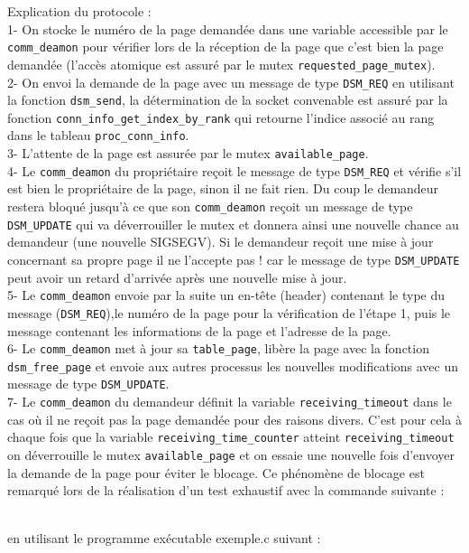 \noindent
Explication du protocole : \\
1- On stocke le numéro de la page demandée dans une variable accessible par le \texttt{comm\_deamon} pour vérifier lors de la réception de la page que c'est bien la page demandée (l'accès atomique est assuré par le mutex  \texttt{requested\_page\_mutex}).\\
2- On envoi la demande de la page avec un message de type \texttt{DSM\_REQ} en utilisant la fonction \texttt{dsm\_send}, la détermination de la socket convenable est assuré par la fonction \texttt{conn\_info\_get\_index\_by\_rank} qui retourne l'indice associé au rang dans le tableau \texttt{proc\_conn\_info}.\\
3- L'attente de la page est assurée par le mutex \texttt{available\_page}.\\
4- Le \texttt{comm\_deamon} du propriétaire reçoit le message de type \texttt{DSM\_REQ} et vérifie s'il est bien le propriétaire de la page, sinon il ne fait rien. Du coup le demandeur restera bloqué jusqu'à ce que son \texttt{comm\_deamon} reçoit un message de type \texttt{DSM\_UPDATE} qui va déverrouiller le mutex et donnera ainsi une nouvelle chance au demandeur (une nouvelle SIGSEGV). Si le demandeur reçoit une mise à jour concernant sa propre page il ne l'accepte pas ! car le message de type \texttt{DSM\_UPDATE} peut avoir un retard d'arrivée après une nouvelle mise à jour. \\
5- Le \texttt{comm\_deamon} envoie par la suite un en-tête (header) contenant le type du message (\texttt{DSM\_REQ}),le numéro de la page pour la vérification de l'étape 1, puis le message contenant les informations de la page et l'adresse de la page.\\
6- Le \texttt{comm\_deamon} met à jour sa \texttt{table\_page}, libère la page avec la fonction \texttt{dsm\_free\_page} et envoie aux autres processus les nouvelles modifications avec un message de type \texttt{DSM\_UPDATE}.\\
7- Le \texttt{comm\_deamon} du demandeur définit la variable \texttt{receiving\_timeout} dans le cas où il ne reçoit pas la page demandée pour des raisons divers. C'est pour cela à chaque fois que la variable \texttt{receiving\_time\_counter} atteint \texttt{receiving\_timeout} on déverrouille le mutex \texttt{available\_page} et on essaie une nouvelle fois d'envoyer la demande de la page pour éviter le blocage. Ce phénomène de blocage est remarqué lors de la réalisation d'un test exhaustif avec la commande suivante :
\begin{center}
\end{center} \\
en utilisant le programme exécutable exemple.c suivant :\\

